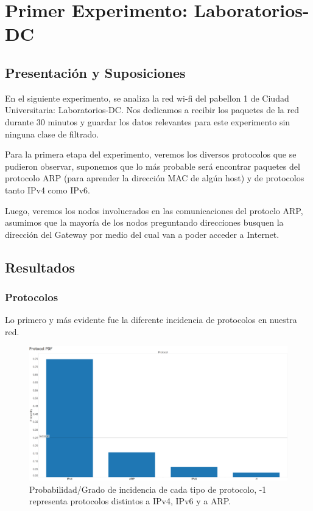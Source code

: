 \documentclass{article}
\theoremstyle{definition}
\theoremstyle{remark}
\begin{document}
\newpage
\section{Primer Experimento: Laboratorios-DC}

\subsection{Presentación y Suposiciones}

En el siguiente experimento, se analiza la red wi-fi del pabellon 1 de Ciudad Universitaria: Laboratorios-DC. Nos dedicamos a recibir los paquetes de la red durante 30 minutos y guardar los datos relevantes para este experimento sin ninguna clase de filtrado.

Para la primera etapa del experimento, veremos los diversos protocolos que se pudieron observar, suponemos que lo más probable será encontrar paquetes del protocolo ARP (para aprender la dirección MAC de algún host) y de protocolos tanto IPv4 como IPv6.

Luego, veremos los nodos involucrados en las comunicaciones del protoclo ARP, asumimos que la mayoría de los nodos preguntando direcciones busquen la dirección del Gateway por medio del cual van a poder acceder a Internet.

\subsection{Resultados}

\subsubsection{Protocolos}

Lo primero y más evidente fue la diferente incidencia de protocolos en nuestra red.

\begin{figure}[H]
\centering
\includegraphics[width=450pt]{captures/LabosDC/Protocol PDF Dashboard Probabilitidad.png}
\caption{Probabilidad/Grado de incidencia de cada tipo de protocolo, -1 representa protocolos distintos a IPv4, IPv6 y a ARP.}
\end{figure}
\end{document}
